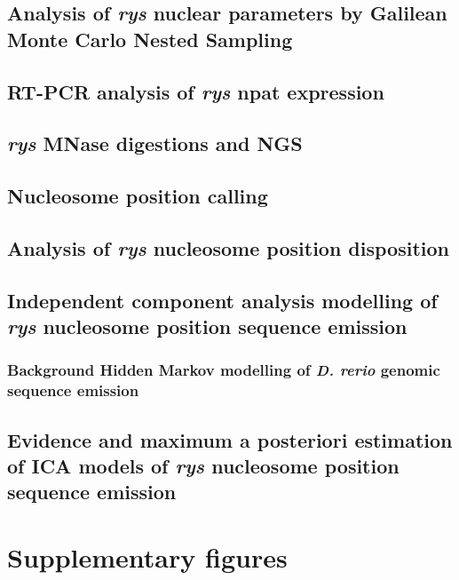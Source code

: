 \subsection{Analysis of \textit{rys} nuclear parameters by Galilean Monte Carlo Nested Sampling}

\subsection{RT-PCR analysis of \textit{rys} npat expression}

\subsection{\textit{rys} MNase digestions and NGS}

\subsection{Nucleosome position calling}

\subsection{Analysis of \textit{rys} nucleosome position disposition}

\subsection{Independent component analysis modelling of \textit{rys} nucleosome position sequence emission}

\subsubsection{Background Hidden Markov modelling of \textit{D. rerio} genomic sequence emission}

\subsection{Evidence and maximum a posteriori estimation of ICA models of \textit{rys} nucleosome position sequence emission}

\section{Supplementary figures}

